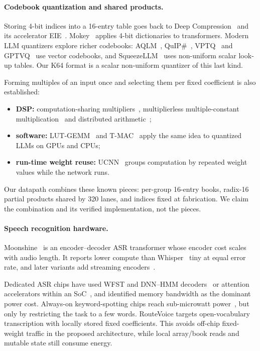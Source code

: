 \paragraph{Codebook quantization and shared products.}
Storing 4-bit indices into a 16-entry table goes back to Deep Compression~\cite{han2016deepcompression} and its accelerator EIE~\cite{han2016eie}. Mokey~\cite{zadeh2022mokey} applies 4-bit dictionaries to transformers. Modern LLM quantizers explore richer codebooks: AQLM~\cite{egiazarian2024aqlm}, QuIP\#~\cite{tseng2024quipsharp}, VPTQ~\cite{liu2024vptq} and GPTVQ~\cite{vanbaalen2024gptvq} use vector codebooks, and SqueezeLLM~\cite{kim2024squeezellm} uses non-uniform scalar look-up tables. Our K64 format is a scalar non-uniform quantizer of this last kind.

Forming multiples of an input once and selecting them per fixed coefficient is also established:
\begin{itemize}
\item \textbf{DSP:} computation-sharing multipliers~\cite{park2002cshm}, multiplierless multiple-constant multiplication~\cite{voronenko2007mcm} and distributed arithmetic~\cite{white1989da};
\item \textbf{software:} LUT-GEMM~\cite{park2024lutgemm} and T-MAC~\cite{wei2025tmac} apply the same idea to quantized LLMs on GPUs and CPUs;
\item \textbf{run-time weight reuse:} UCNN~\cite{hegde2018ucnn} groups computation by repeated weight values while the network runs.
\end{itemize}
Our datapath combines these known pieces: per-group 16-entry books, radix-16 partial products shared by 320 lanes, and indices fixed at fabrication. We claim the combination and its verified implementation, not the pieces.

\paragraph{Speech recognition hardware.}
Moonshine~\cite{jeffries2024moonshine} is an encoder--decoder ASR transformer whose encoder cost scales with audio length. It reports lower compute than Whisper~\cite{radford2022whisper} tiny at equal error rate, and later variants add streaming encoders~\cite{kudlur2026moonshinev2}.

Dedicated ASR chips have used WFST and DNN--HMM decoders~\cite{price2015wfst,price2018speech} or attention accelerators within an SoC~\cite{tambe2021sm6}, and identified memory bandwidth as the dominant power cost. Always-on keyword-spotting chips reach sub-microwatt power~\cite{shan2020kws,giraldo2018laika}, but only by restricting the task to a few words. RouteVoice targets open-vocabulary transcription with locally stored fixed coefficients. This avoids off-chip fixed-weight traffic in the proposed architecture, while local array/book reads and mutable state still consume energy.

